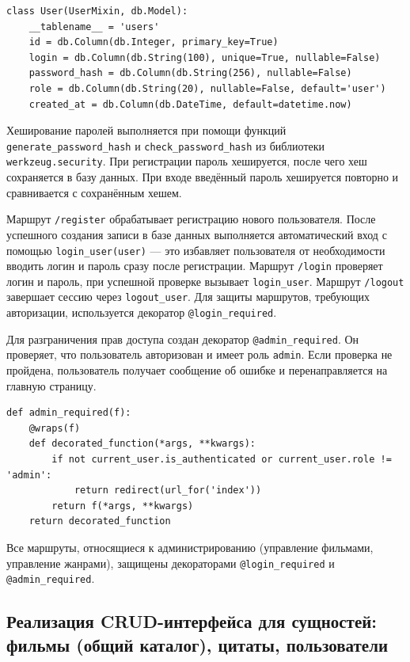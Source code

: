 \begin{lstlisting}[caption={Модель пользователя (models.py)}, label={lst:user_model}]
class User(UserMixin, db.Model):
    __tablename__ = 'users'
    id = db.Column(db.Integer, primary_key=True)
    login = db.Column(db.String(100), unique=True, nullable=False)
    password_hash = db.Column(db.String(256), nullable=False)
    role = db.Column(db.String(20), nullable=False, default='user')
    created_at = db.Column(db.DateTime, default=datetime.now)
\end{lstlisting}

Хеширование паролей выполняется при помощи функций \texttt{generate\_\-password\_hash} и 
\texttt{check\_password\_hash} из библиотеки \texttt{werkzeug.security}. При регистрации 
пароль хешируется, после чего хеш сохраняется в базу данных. При входе введённый пароль 
хешируется повторно и сравнивается с сохранённым хешем.

Маршрут \texttt{/register} обрабатывает регистрацию нового пользователя. После успешного 
создания записи в базе данных выполняется автоматический вход с помощью 
\texttt{login\_user(user)} — это избавляет пользователя от необходимости вводить логин и 
пароль сразу после регистрации. Маршрут \texttt{/login} проверяет логин и пароль, при 
успешной проверке вызывает \texttt{login\_user}. Маршрут \texttt{/logout} завершает сессию 
через \texttt{logout\_user}. Для защиты маршрутов, требующих авторизации, используется 
декоратор \texttt{@login\_required}.

Для разграничения прав доступа создан декоратор \texttt{@admin\_required}. Он проверяет, 
что пользователь авторизован и имеет роль \texttt{admin}. Если проверка не пройдена, 
пользователь получает сообщение об ошибке и перенаправляется на главную страницу.

\begin{lstlisting}[caption={Декоратор для проверки прав администратора (app.py)}, label={lst:admin_decorator}]
def admin_required(f):
    @wraps(f)
    def decorated_function(*args, **kwargs):
        if not current_user.is_authenticated or current_user.role != 'admin':
            return redirect(url_for('index'))
        return f(*args, **kwargs)
    return decorated_function
\end{lstlisting}

Все маршруты, относящиеся к администрированию (управление фильмами, управление жанрами), 
защищены декораторами \texttt{@login\_required} и \texttt{@admin\_required}.

\subsection{Реализация CRUD-интерфейса для сущностей: фильмы (общий каталог), цитаты, пользователи}

